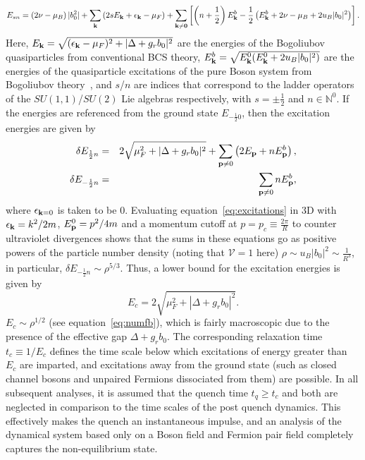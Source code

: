 \documentclass[a4paper,10pt]{article}
\begin{document}
\begin{equation}
E_{sn} = \left(2\nu-\mu_B \right)|b^2_0| + \sum_{\bf k} \left(2sE_{\bf k} +\epsilon_{\bf k}-\mu_F \right) +\sum_{\bf k\neq 0} \left[ \left( n+\frac{1}{2}\right)E^b_{\bf k} -\frac{1}{2}\left(E^b_{\bf k} + 2\nu-\mu_B+2u_B|b_0|^2\right)\right].  
\end{equation}
Here, $E_{\bf k} = \sqrt{(\epsilon_{\bf k}-\mu_F)^2+|\Delta+g_rb_0|^2}$ are the energies of the Bogoliubov quasiparticles from conventional BCS theory, $E^b_{\bf k} = \sqrt{E^0_{\bf k}(E^0_{\bf k} + 2u_B |b_0|^2)}$ are the energies of the quasiparticle excitations of  the pure Boson system from Bogoliubov theory~\cite{huang:becbcs2}, and $s$/$n$ are indices that correspond to the ladder operators of the $SU(1,1)$/$SU(2)$ Lie algebras respectively, with $s=\pm\frac{1}{2}$ and $n\in\mathbb{N}^0$. If the energies are referenced from the ground state $E_{-\frac{1}{2}0}$, then the excitation energies are given by
\begin{eqnarray}
\label{eq:excitations}
 \delta E_{\frac{1}{2}n}&=& 2\sqrt{\mu^2_F + |\Delta + g_rb_0|^2} + \sum_{{\bf p}\neq 0}
\left(2E_{\bf p}+nE^b_{\bf p} \right),  \nonumber \\
\delta E_{-\frac{1}{2}n} &=& \sum_{{\bf p}\neq0} nE^b_{\bf p}, 
\end{eqnarray}
where $\epsilon_{{\bf k}=0}$ is taken to be $0$. Evaluating equation~\ref{eq:excitations} in $3$D with $\epsilon_{\bf k} = k^2/2m$, $E^0_{\bf p}=p^2/4m$ and a momentum cutoff at $p=p_c\equiv\frac{2\pi}{R}$ to counter ultraviolet divergences shows that the sums in these equations go as positive powers of the particle number density (noting that $\mathcal{V}=1$ here) $\rho\sim u_B |b_0|^2\sim\frac{1}{R^3}$, in particular,  $\delta E_{-\frac{1}{2}n}\sim \rho^{5/3}$. Thus, a lower bound for the excitation energies is given by 
\begin{equation}
E_c = 2\sqrt{\mu^2_F + |\Delta + g_rb_0|^2}.
\end{equation}
$E_c\sim \rho^{1/2}$ (see equation~\ref{eq:numfb}), which is fairly macroscopic due to the presence of the effective gap $\Delta + g_rb_0$. The corresponding relaxation time $t_c\equiv 1/E_c$ defines the time scale below which excitations of energy greater than $E_c$ are imparted, and  excitations away from the ground state (such as closed channel bosons and unpaired Fermions dissociated from them) are possible. In all subsequent analyses, it is assumed that the quench time $t_q \geq t_c$ and both are neglected in comparison to the time scales of the post quench dynamics. This effectively makes the quench an instantaneous impulse, and an analysis of the dynamical system based only on a Boson field and Fermion pair field completely captures the non-equilibrium state.
\end{document}
